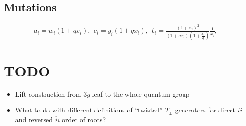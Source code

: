 \documentclass{paper}
\def\be{\begin{eqnarray}}
\def\ee{\end{eqnarray}}
\def\lb{\left (}
\def\rb{\right )}
\begin{document}
\subsection{Mutations}

\be
  a_i = w_i (1 + q x_i),\ \ c_i = y_i(1 + q x_i), \ \ b_i = \frac{\lb 1 + x_i\rb^2}{\lb 1 + q x_i\rb\lb 1 + \frac{x_i}{q}\rb} \frac{1}{x_i},
\ee

\section{TODO}
\begin{itemize}
\item Lift construction from $3g$ leaf to the whole quantum group
\item What to do with different definitions of ``twisted'' $T_\pm$ generators
for direct $i\overline{i}$ and reversed $\overline{i}i$ order of roots?
\end{itemize}
\end{document}
